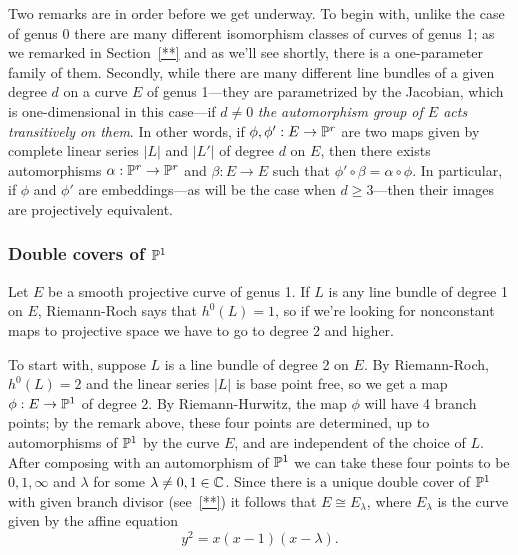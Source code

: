 Two remarks are in order before we get underway. To begin with, unlike the case of genus 0 there are many different isomorphism classes of curves of genus 1; as we remarked in Section~\ref{**} and as we'll see shortly, there is a one-parameter family of them. Secondly, while there are many different line bundles of a given degree $d$ on a curve $E$ of genus 1---they are parametrized by the Jacobian, which is one-dimensional in this case---if $d \neq 0$ \emph{the automorphism group of $E$ acts transitively on them}. In other words, if $\phi, \phi' : E \to {\mathbb P}^r$ are two maps given by complete linear series $|L|$ and $|L'|$ of degree $d$ on $E$, then there exists  automorphisms $\alpha : {\mathbb P}^r \to {\mathbb P}^r$ and $\beta : E \to E$ such that $\phi' \circ \beta= \alpha \circ \phi$. In particular, if $\phi$ and $\phi'$ are embeddings---as will be the case when $d \geq 3$---then their images are projectively equivalent.

\subsubsection{Double covers of ${\mathbb P}^1$}

Let $E$ be a smooth projective curve of genus 1. If $L$ is any line bundle of degree 1 on $E$, Riemann-Roch says that $h^0(L) = 1$, so if we're looking for nonconstant maps to projective space we have to go to degree 2 and higher.

To start with, suppose $L$ is a line bundle of degree 2 on $E$. By Riemann-Roch, $h^0(L) = 2$ and the linear series $|L|$ is base point free, so we get a map $\phi : E \to {\mathbb P}^1$ of degree 2. By Riemann-Hurwitz, the map $\phi$ will have 4 branch points; by the remark above, these four points are determined, up to automorphisms of ${\mathbb P}^1$ by the curve $E$, and are independent of the choice of $L$.
After composing with an automorphism of ${\mathbb P}^1$ we can take these four points to be $0, 1, \infty$ and $\lambda$ for some $\lambda \neq 0, 1 \in {\mathbb C}$. Since there is a unique double cover of ${\mathbb P}^1$ with given branch divisor (see~\ref{**}) it follows that $E \cong E_\lambda$, where $E_\lambda$ is the curve given by the affine equation
$$
y^2 = x(x-1)(x-\lambda).
$$

